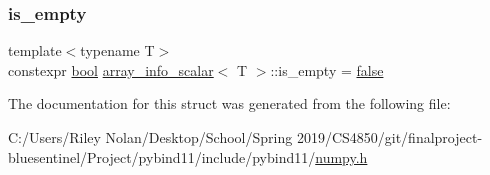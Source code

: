 \mbox{\label{structarray__info__scalar_aad5f2d891b5d8552e88e6da41d40d1c2}} 
\subsubsection{\texorpdfstring{is\_empty}{is\_empty}}
{\footnotesize\ttfamily template$<$typename T$>$ \\
constexpr \mbox{\hyperlink{asdl_8h_af6a258d8f3ee5206d682d799316314b1}{bool}} \mbox{\hyperlink{structarray__info__scalar}{array\+\_\+info\+\_\+scalar}}$<$ T $>$\+::is\+\_\+empty = \mbox{\hyperlink{asdl_8h_af6a258d8f3ee5206d682d799316314b1ae9de385ef6fe9bf3360d1038396b884c}{false}}\hspace{0.3cm}{\ttfamily [static]}}



The documentation for this struct was generated from the following file\+:\begin{DoxyCompactItemize}
\item 
C\+:/\+Users/\+Riley Nolan/\+Desktop/\+School/\+Spring 2019/\+C\+S4850/git/finalproject-\/bluesentinel/\+Project/pybind11/include/pybind11/\mbox{\hyperlink{numpy_8h}{numpy.\+h}}\end{DoxyCompactItemize}

